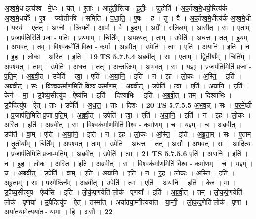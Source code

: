 \documentclass[17pt]{extarticle}
\begin{document}
                  अ॒श्व॒मे॒ध इत्य॑श्व - मे॒धः । यत् । ए॒ताः । आहु॑ती॒रित्या - हु॒तीः॒ । जु॒होति॑ । अ॒र्का॒श्व॒मे॒धयो॒रित्य॑र्क - अ॒श्व॒मे॒धयोः᳚ । ए॒व । ज्योतीꣳ॑षि । समिति॑ । द॒धा॒ति॒ । ए॒षः । ह॒ । तु । वै । अ॒र्का॒श्व॒मे॒धीत्य॑र्क-अ॒श्व॒मे॒धी । यस्य॑ । ए॒तत् । अ॒ग्नौ । क्रि॒यते᳚ । आपः॑ । वै । इ॒दम् । अग्रे᳚ । स॒लि॒लम् । आ॒सी॒त् । सः । ए॒ताम् । प्र॒जाप॑ति॒रिति॑ प्र॒जा - प॒तिः॒ । प्र॒थ॒माम् । चिति᳚म् । अ॒प॒श्य॒त् । ताम् । उपेति॑ । अ॒ध॒त्त॒ । तत् । इ॒यम् । अ॒भ॒व॒त् । तम् । वि॒श्वक॒र्मेति॑ वि॒श्व - क॒र्मा॒ । अ॒ब्र॒वी॒त् । उपेति॑ । त्वा॒ । एति॑ । अ॒या॒नि॒ । इति॑ । न । इ॒ह । लो॒कः । अ॒स्ति॒ । इति॑ । \textbf{  19} \newline
                  \newline
                                \textbf{ TS 5.7.5.4} \newline
                  अ॒ब्र॒वी॒त् । सः । ए॒ताम् । द्वि॒तीया᳚म् । चिति᳚म् । अ॒प॒श्य॒त् । ताम् । उपेति॑ । अ॒ध॒त्त॒ । तत् । अ॒न्तरि॑क्षम् । अ॒भ॒व॒त् । सः । य॒ज्ञ्ः । प्र॒जाप॑ति॒मिति॑ प्र॒जा - प॒ति॒म् । अ॒ब्र॒वी॒त् । उपेति॑ । त्वा॒ । एति॑ । अ॒या॒नि॒ । इति॑ । न । इ॒ह । लो॒कः । अ॒स्ति॒ । इति॑ । अ॒ब्र॒वी॒त् । सः । वि॒श्वक॑र्माण॒मिति॑ वि॒श्व-क॒र्मा॒ण॒म् । अ॒ब्र॒वी॒त् । उपेति॑ । त्वा॒ । एति॑ । अ॒या॒नि॒ । इति॑ । केन॑ । मा॒ । उ॒पैष्य॒सीत्यु॑प - ऐष्य॑सि । इति॑ । दिश्या॑भिः । इति॑ । अ॒ब्र॒वी॒त् । तम् । दिश्या॑भिः । उ॒पैदित्यु॑प - ऐत् । ताः । उपेति॑ । अ॒ध॒त्त॒ । ताः । दिशः॑ । \textbf{  20} \newline
                  \newline
                                \textbf{ TS 5.7.5.5} \newline
                  अ॒भ॒व॒न्न् । सः । प॒र॒मे॒ष्ठी । प्र॒जाप॑ति॒मिति॑ प्र॒जा-प॒ति॒म् । अ॒ब्र॒वी॒त् । उपेति॑ । त्वा॒ । एति॑ । अ॒या॒नि॒ । इति॑ । न । इ॒ह । लो॒कः । अ॒स्ति॒ । इति॑ । अ॒ब्र॒वी॒त् । सः । वि॒श्वक॑र्माण॒मिति॑ वि॒श्व - क॒र्मा॒ण॒म् । च॒ । य॒ज्ञ्म् । च॒ । अ॒ब्र॒वी॒त् । उपेति॑ । वा॒म् । एति॑ । अ॒या॒नि॒ । इति॑ । न । इ॒ह । लो॒कः । अ॒स्ति॒ । इति॑ । अ॒ब्रू॒ता॒म् । सः । ए॒ताम् । तृ॒तीया᳚म् । चिति᳚म् । अ॒प॒श्य॒त् । ताम् । उपेति॑ । अ॒ध॒त्त॒ । तत् । अ॒सौ । अ॒भ॒व॒त् । सः । आ॒दि॒त्यः । प्र॒जाप॑ति॒मिति॑ प्र॒जा-प॒ति॒म् । अ॒ब्र॒वी॒त् । उपेति॑ । त्वा॒ । \textbf{  21} \newline
                  \newline
                                \textbf{ TS 5.7.5.6} \newline
                  एति॑ । अ॒या॒नि॒ । इति॑ । न । इ॒ह । लो॒कः । अ॒स्ति॒ । इति॑ । अ॒ब्र॒वी॒त् । सः । वि॒श्वक॑र्माण॒मिति॑ वि॒श्व - क॒र्मा॒ण॒म् । च॒ । य॒ज्ञ्म् । च॒ । अ॒ब्र॒वी॒त् । उपेति॑ । वा॒म् । एति॑ । अ॒या॒नि॒ । इति॑ । न । इ॒ह । लो॒कः । अ॒स्ति॒ । इति॑ । अ॒ब्रू॒ता॒म् । सः । प॒र॒मे॒ष्ठिन᳚म् । अ॒ब्र॒वी॒त् । उपेति॑ । त्वा॒ । एति॑ । अ॒या॒नि॒ । इति॑ । केन॑ । मा॒ । उ॒पैष्य॒सीत्यु॑प - ऐष्य॑सि । इति॑ । लो॒कं॒पृ॒णयेति॑ लोकं - पृ॒णया᳚ । इति॑ । अ॒ब्र॒वी॒त् । तम् । लो॒क॒पृं॒णयेति॑ लोकं - पृ॒णया᳚ । उ॒पैदित्यु॑प - ऐत् । तस्मा᳚त् । अया॑तया॒म्नीत्यया॑त - या॒म्नी॒ । लो॒क॒पृं॒णेति॑ लोकं - पृ॒णा । अया॑तया॒मेत्यया॑त - या॒मा॒ । हि । अ॒सौ । \textbf{  22} \newline
\end{document}
